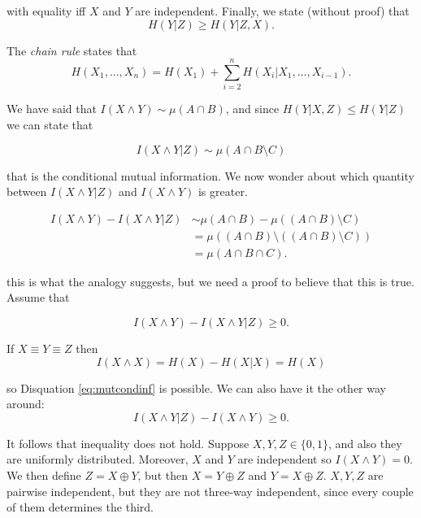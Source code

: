 with equality iff $X$ and $Y$ are independent. Finally, we state (without proof) that
\begin{equation}
 H(Y|Z) \geq H(Y |Z, X). 
\end{equation}

\begin{prop}
The \emph{chain rule} states that
\begin{equation}
 H(X_1, \ldots, X_n) = H(X_1) + \sum_{i = 2}^n H(X_i | X_1, \ldots, X_{i-1}).
\end{equation}
\end{prop}

We have said that $I(X \wedge Y) \sim \mu(A \cap B)$, and since $H(Y | X, Z) \leq H(Y|Z)$ we can state that

\[
 I(X\wedge Y | Z) \sim \mu(A \cap B \setminus C)
\]

that is the conditional mutual information. We now wonder about which quantity between $I(X \wedge Y | Z)$ and $I(X \wedge Y)$ is greater.

\begin{align*}
 I(X \wedge Y) -  I(X\wedge Y | Z)  & \sim \mu(A \cap B) - \mu((A \cap B) \setminus C)\\
 & = \mu((A \cap B) \setminus ((A \cap B) \setminus C)) \\ 
 & = \mu(A \cap B \cap C). 
\end{align*}

this is what the analogy suggests, but we need a proof to believe that this is true. Assume that

\begin{equation}\label{eq:mutcondinf}
 I(X \wedge Y) - I(X \wedge Y | Z) \geq 0.
\end{equation}

If $X \equiv Y \equiv Z$ then
\begin{equation}
I(X \wedge X) = H(X) - H(X|X) = H(X) 
\end{equation}

so Disquation \ref{eq:mutcondinf} is possible. We can also have it the other way around:
\begin{equation}
I(X \wedge Y | Z) - I(X \wedge Y)\geq 0. 
\end{equation}

It follows that inequality does not hold. Suppose $X, Y, Z \in \{0, 1\}$, and also they are uniformly distributed. Moreover, $X$ and $Y$ are independent so $I(X \wedge Y) = 0$. We then define $Z = X \oplus Y$, but then $X = Y \oplus Z$ and $Y = X \oplus Z$. $X, Y, Z$ are pairwise independent, but they are not three-way independent, since every couple of them determines the third.

